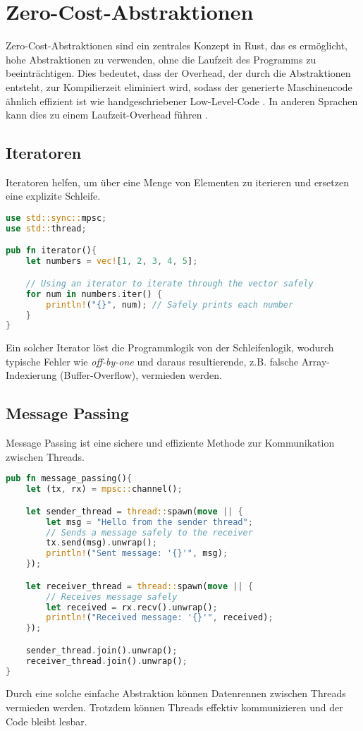 \chapter{Zero-Cost-Abstraktionen}

Zero-Cost-Abstraktionen sind ein zentrales Konzept in Rust, das es ermöglicht, hohe Abstraktionen zu verwenden, ohne die Laufzeit des Programms zu beeinträchtigen. 
Dies bedeutet, dass der Overhead, der durch die Abstraktionen entsteht, zur Kompilierzeit eliminiert wird, sodass der generierte Maschinencode ähnlich effizient ist wie handgeschriebener Low-Level-Code \cite{sequeira2023}. 
In anderen Sprachen kann dies zu einem Laufzeit-Overhead führen \cite{haberman2014}.

\section{Iteratoren}
Iteratoren helfen, um über eine Menge von Elementen zu iterieren und ersetzen eine explizite Schleife.
\begin{lstlisting}[language=Rust, caption=Iterator]
use std::sync::mpsc;
use std::thread;

pub fn iterator(){
    let numbers = vec![1, 2, 3, 4, 5];

    // Using an iterator to iterate through the vector safely
    for num in numbers.iter() {
        println!("{}", num); // Safely prints each number
    }
}
\end{lstlisting}
Ein solcher Iterator löst die Programmlogik von der Schleifenlogik, wodurch typische Fehler wie \textit{\gls{off-by-one}} und daraus resultierende, z.B. falsche Array-Indexierung (Buffer-Overflow), vermieden werden.
\cleardoublepage
\section{Message Passing}

Message Passing ist eine sichere und effiziente Methode zur Kommunikation zwischen Threads.

\begin{lstlisting}[language=Rust, caption=Message Passing ]
pub fn message_passing(){
    let (tx, rx) = mpsc::channel();

    let sender_thread = thread::spawn(move || {
        let msg = "Hello from the sender thread";
        // Sends a message safely to the receiver
        tx.send(msg).unwrap(); 
        println!("Sent message: '{}'", msg);
    });

    let receiver_thread = thread::spawn(move || {
        // Receives message safely
        let received = rx.recv().unwrap(); 
        println!("Received message: '{}'", received);
    });

    sender_thread.join().unwrap();
    receiver_thread.join().unwrap();
}
\end{lstlisting}
Durch eine solche einfache Abstraktion können Datenrennen zwischen Threads vermieden werden. 
Trotzdem können Threads effektiv kommunizieren und der Code bleibt lesbar.
\cleardoublepage
